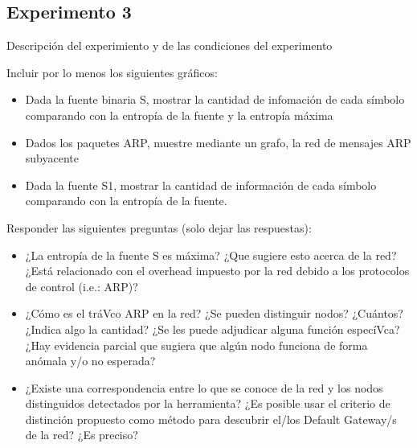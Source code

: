 \subsection{Experimento 3}

Descripci\'on del experimiento y de las condiciones del experimento

Incluir por lo menos los siguientes gr\'aficos:

\begin{itemize}
	\item Dada la fuente binaria S, mostrar la cantidad de infomación de cada símbolo comparando con la entropía de la fuente y la entropía máxima
	\item Dados los paquetes ARP, muestre mediante un grafo, la red de mensajes ARP subyacente
	\item Dada la fuente S1, mostrar la cantidad de información de cada símbolo comparando con la entropía de la fuente.
\end{itemize}

Responder las siguientes preguntas (solo dejar las respuestas):

\begin{itemize}
	\item ¿La entropía de la fuente S es máxima? ¿Que sugiere esto acerca de la red? ¿Está relacionado con el overhead impuesto por la red debido a los protocolos de control (i.e.: ARP)?
	\item ¿Cómo es el tráVco ARP en la red? ¿Se pueden distinguir nodos? ¿Cuántos? ¿Indica algo la cantidad? ¿Se les puede adjudicar alguna función especíVca? ¿Hay evidencia parcial que sugiera que algún nodo funciona de forma anómala y/o no esperada?
	\item ¿Existe una correspondencia entre lo que se conoce de la red y los nodos distinguidos detectados por la herramienta? ¿Es posible usar el criterio de distinción propuesto como método para descubrir el/los Default Gateway/s de la red? ¿Es preciso?
\end{itemize}
